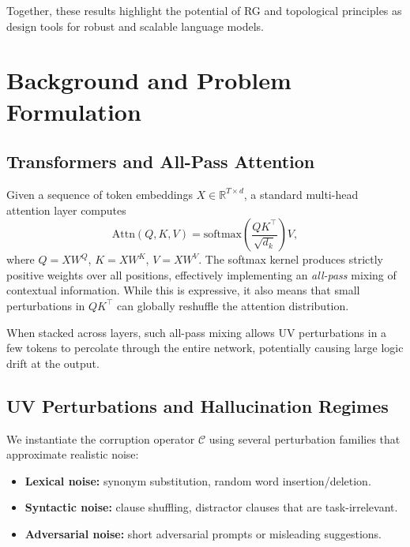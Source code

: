 \documentclass{article}
\begin{document}
Together, these results highlight the potential of RG and topological principles as design tools for robust and scalable language models.

\section{Background and Problem Formulation}

\subsection{Transformers and All-Pass Attention}

Given a sequence of token embeddings $X \in \mathbb{R}^{T \times d}$, a standard multi-head attention layer computes
\begin{equation}
    \mathrm{Attn}(Q,K,V) = \mathrm{softmax}\!\left(\frac{QK^\top}{\sqrt{d_k}}\right) V,
\end{equation}
where $Q = XW^Q$, $K = XW^K$, $V = XW^V$. The softmax kernel produces strictly positive weights over all positions, effectively implementing an \emph{all-pass} mixing of contextual information. While this is expressive, it also means that small perturbations in $QK^\top$ can globally reshuffle the attention distribution.

When stacked across layers, such all-pass mixing allows UV perturbations in a few tokens to percolate through the entire network, potentially causing large logic drift at the output.

\subsection{UV Perturbations and Hallucination Regimes}

We instantiate the corruption operator $\mathcal{C}$ using several perturbation families that approximate realistic noise:

\begin{itemize}[leftmargin=*]
    \item \textbf{Lexical noise:} synonym substitution, random word insertion/deletion.
    \item \textbf{Syntactic noise:} clause shuffling, distractor clauses that are task-irrelevant.
    \item \textbf{Adversarial noise:} short adversarial prompts or misleading suggestions.
\end{itemize}
\end{document}
